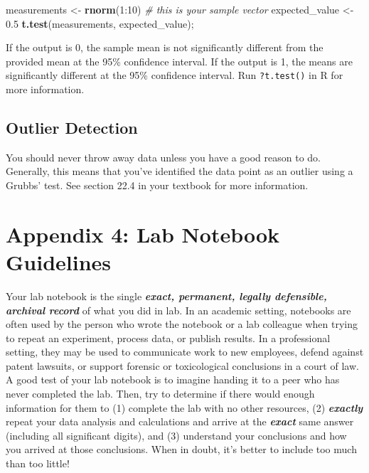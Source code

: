 \documentclass[]{tufte-book}
\newenvironment{Shaded}{}{}
\newcommand{\CommentTok}[1]{\textcolor[rgb]{0.38,0.63,0.69}{\textit{#1}}}
\newcommand{\DecValTok}[1]{\textcolor[rgb]{0.25,0.63,0.44}{#1}}
\newcommand{\FloatTok}[1]{\textcolor[rgb]{0.25,0.63,0.44}{#1}}
\newcommand{\KeywordTok}[1]{\textcolor[rgb]{0.00,0.44,0.13}{\textbf{#1}}}
\newcommand{\NormalTok}[1]{#1}
\newcommand{\OperatorTok}[1]{\textcolor[rgb]{0.40,0.40,0.40}{#1}}
\newcommand{\StringTok}[1]{\textcolor[rgb]{0.25,0.44,0.63}{#1}}
\begin{document}
\begin{Shaded}
\begin{Highlighting}[]
\NormalTok{measurements <-}\StringTok{ }\KeywordTok{rnorm}\NormalTok{(}\DecValTok{1}\OperatorTok{:}\DecValTok{10}\NormalTok{) }\CommentTok{# this is your sample vector}
\NormalTok{expected_value <-}\StringTok{ }\FloatTok{0.5}
\KeywordTok{t.test}\NormalTok{(measurements, expected_value);}
\end{Highlighting}
\end{Shaded}

If the output is 0, the sample mean is not significantly different from the provided mean at the 95\% confidence interval. If the output is 1, the means are significantly different at the 95\% confidence interval. Run \texttt{?t.test()} in R for more information.

\hypertarget{outlier-detection}{%
\section*{Outlier Detection}\label{outlier-detection}}

You should never throw away data unless you have a good reason to do. Generally, this means that you've identified the data point as an outlier using a Grubbs' test. See section 22.4 in your textbook for more information.

\hypertarget{appendix-4-lab-notebook-guidelines}{%
\chapter*{Appendix 4: Lab Notebook Guidelines}\label{appendix-4-lab-notebook-guidelines}}

Your lab notebook is the single \textbf{\emph{exact, permanent, legally defensible, archival record}} of what you did in lab. In an academic setting, notebooks are often used by the person who wrote the notebook or a lab colleague when trying to repeat an experiment, process data, or publish results. In a professional setting, they may be used to communicate work to new employees, defend against patent lawsuits, or support forensic or toxicological conclusions in a court of law. A good test of your lab notebook is to imagine handing it to a peer who has never completed the lab. Then, try to determine if there would enough information for them to (1) complete the lab with no other resources, (2) \textbf{\emph{exactly}} repeat your data analysis and calculations and arrive at the \textbf{\emph{exact}} same answer (including all significant digits), and (3) understand your conclusions and how you arrived at those conclusions. When in doubt, it's better to include too much than too little!
\end{document}
